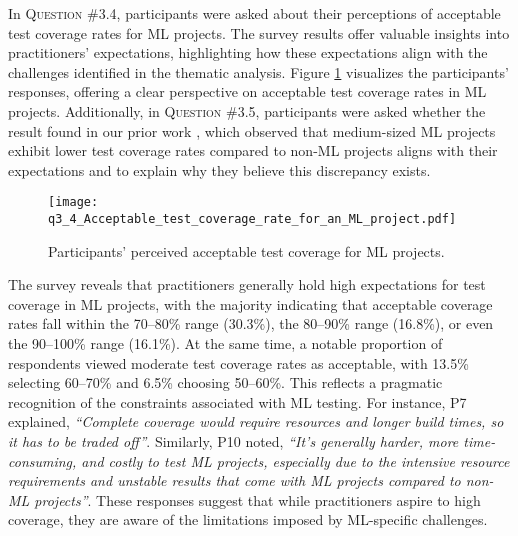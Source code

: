 In \textsc{Question \#3.4}, participants were asked about their perceptions of acceptable test coverage rates for ML projects. The survey results offer valuable insights into practitioners' expectations, highlighting how these expectations align with the challenges identified in the thematic analysis. Figure \ref{fig:q3_4_Acceptable_test_coverage_rate_for_an_ML_project} visualizes the participants' responses, offering a clear perspective on acceptable test coverage rates in ML projects. Additionally, in \textsc{Question \#3.5}, participants were asked whether the result found in our prior work \citep{bernardo2024machine}, which observed that medium-sized ML projects exhibit lower test coverage rates compared to non-ML projects aligns with their expectations and to explain why they believe this discrepancy exists. 

\begin{figure}
	\centering
	\texttt{[image: q3\_4\_Acceptable\_test\_coverage\_rate\_for\_an\_ML\_project.pdf]}	
	\caption{Participants' perceived acceptable test coverage for ML projects.}	\label{fig:q3_4_Acceptable_test_coverage_rate_for_an_ML_project}       %
\end{figure}

The survey reveals that practitioners generally hold high expectations for test coverage in ML projects, with the majority indicating that acceptable coverage rates fall within the 70–80\% range (30.3\%), the 80–90\% range (16.8\%), or even the 90–100\% range (16.1\%). 
At the same time, a notable proportion of respondents viewed moderate test coverage rates as acceptable, with 13.5\% selecting 60–70\% and 6.5\% choosing 50–60\%. This reflects a pragmatic recognition of the constraints associated with ML testing. For instance, P7 explained, \textit{``Complete coverage would require resources and longer build times, so it has to be traded off''}. Similarly, P10 noted, \textit{``It's generally harder, more time-consuming, and costly to test ML projects, especially due to the intensive resource requirements and unstable results that come with ML projects compared to non-ML projects''}. These responses suggest that while practitioners aspire to high coverage, they are aware of the limitations imposed by ML-specific challenges.

